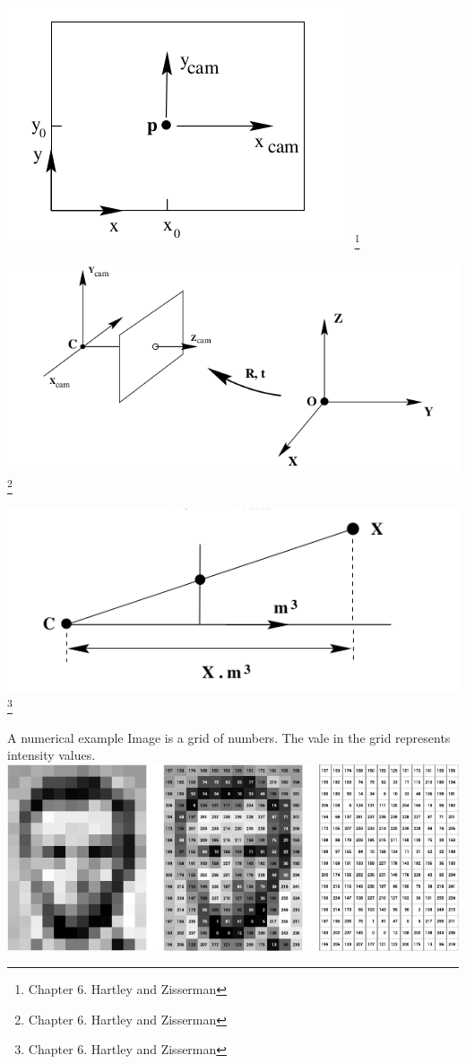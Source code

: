 \documentclass{beamer}
\begin{document}
  \begin{frame}
    \includegraphics[width=0.4\linewidth]{media/image-center.png}
    \footnote{Chapter 6. Hartley and Zisserman}
  \end{frame}

  \begin{frame}
    \includegraphics[width=0.4\linewidth]{media/world-camera-transformation.png}
    \footnote{Chapter 6. Hartley and Zisserman}
  \end{frame}

  \begin{frame}
    \includegraphics[width=0.4\linewidth]{media/recovering-ray-from-point.png}
    \footnote{Chapter 6. Hartley and Zisserman}
  \end{frame}

  \begin{frame}{A numerical example}
    Image is a grid of numbers. The vale in the grid represents intensity values.
    \includegraphics[width=\linewidth]{media/image-as-a-matrix.png}
  \end{frame}
\end{document}
